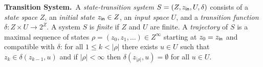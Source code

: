 %

\smallskip
\noindent\textbf{Transition System.}\
A \emph{state-transition system} $S=(Z,z_{\mathsf{in}},U,\delta)$ consists of a \emph{state space} $Z$, an \emph{initial state} $z_{\mathsf{in}}\in Z$, an \emph{input space} $U$, and a \emph{transition function} $\delta:Z\times U \rightarrow 2^Z$. 
A system $S$ is \emph{finite} if $Z$ and $U$ are finite. 
A \emph{trajectory} of $S$ is a maximal sequence of states $\rho = (z_0,z_1,\ldots) \in Z^\infty$ starting at $z_0=z_{\mathsf{in}}$ and compatible with $\delta$:
for all $1\leq k < |\rho|$ there exists $u\in U$ such that $z_k\in \delta(z_{k-1},u)$ and 
if $|\rho| < \infty$ then $\delta(z_{|\rho|},u)= \emptyset$ for all $u\in U$.


